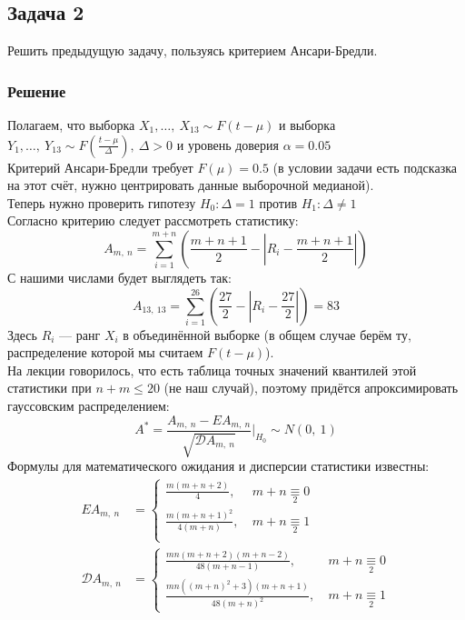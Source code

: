 \documentclass[12pt, a4paper]{article}
\newcommand{\dev}{\mathcal{D}}
\begin{document}
\subsection*{Задача 2}
Решить предыдущую задачу, пользуясь критерием Ансари-Бредли.
\subsubsection*{Решение}
Полагаем, что выборка $X_1,\dots,\ X_{13} \sim F(t - \mu)$ и выборка $Y_1,\dots,\ Y_{13} \sim F\left( \frac{t - \mu}{\Delta} \right),\ \Delta > 0$ и уровень доверия $\alpha = 0.05$\\
Критерий Ансари-Бредли требует $F(\mu) = 0.5$ (в условии задачи есть подсказка на этот счёт, нужно центрировать данные выборочной медианой).\\
Теперь нужно проверить гипотезу $H_0: \Delta = 1$ против $H_1: \Delta \neq 1$\\
Согласно критерию следует рассмотреть статистику:
\[A_{m,\ n} = \sum_{i = 1}^{m + n} \left( \frac{m + n + 1}{2} - \left| R_i - \frac{m + n + 1}{2} \right| \right)\]
С нашими числами будет выглядеть так:
\[A_{13,\ 13} = \sum_{i = 1}^{26} \left( \frac{27}{2} - \left| R_i - \frac{27}{2} \right| \right) = 83\]
Здесь $R_i$ --- ранг $X_i$ в объединённой выборке \big(в общем случае берём ту, распределение которой мы считаем $F(t - \mu)$\big).\\
На лекции говорилось, что есть таблица точных значений квантилей этой статистики при $n + m \leq 20$ (не наш случай), поэтому придётся апроксимировать гауссовским распределением:
\[A^* = \frac{A_{m,\ n} - EA_{m,\ n}}{\sqrt{\dev A_{m,\ n}}}\bigg|_{H_0} \sim N(0,\ 1)\]
Формулы для математического ожидания и дисперсии статистики известны:
\begin{equation*}
    \begin{aligned}
        EA_{m,\ n} &= \begin{cases}
            \frac{m(m + n + 2)}{4},\ & m + n \underset{2}{\equiv} 0\\
            \frac{m{(m + n + 1)}^2}{4(m + n)},\ & m + n \underset{2}{\equiv} 1\\
        \end{cases}\\
        \dev A_{m,\ n} &= \begin{cases}
            \frac{mn(m + n + 2)(m + n - 2)}{48(m + n - 1)},\ & m + n \underset{2}{\equiv} 0\\
            \frac{mn\left({(m + n)}^2 + 3\right)(m + n + 1)}{48 {(m + n)}^2},\   & m + n \underset{2}{\equiv} 1
        \end{cases}
    \end{aligned}
\end{equation*}
\end{document}
